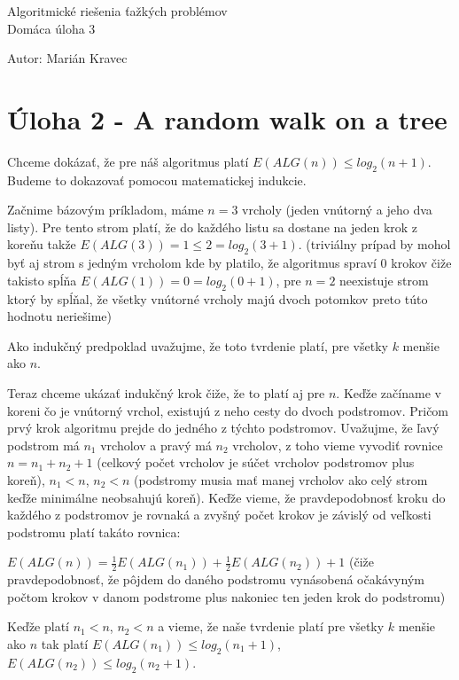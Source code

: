 \documentclass[a4paper]{article}
\begin{document}
 
	
\pagestyle{plain}

\begin{center}
	\sc\large
	Algoritmické riešenia ťažkých problémov\\
	Domáca úloha 3
\end{center}

Autor: Marián Kravec

\section{Úloha 2 - A random walk on a tree}

Chceme dokázať, že pre náš algoritmus platí $E(ALG(n)) \leq log_2(n+1)$.
\\

Budeme to dokazovať pomocou matematickej indukcie.

Začnime bázovým príkladom, máme $n=3$ vrcholy (jeden vnútorný a jeho dva listy).
Pre tento strom platí, že do každého listu sa dostane na jeden krok z koreňu takže $E(ALG(3)) = 1 \le 2 = log_2(3+1)$. (triviálny prípad by mohol byť aj strom s jedným vrcholom kde by platilo, že algoritmus spraví 0 krokov čiže takisto spĺňa $E(ALG(1)) = 0 = log_2(0+1)$, pre $n=2$ neexistuje strom ktorý by spĺňal, že všetky vnútorné vrcholy majú dvoch potomkov preto túto hodnotu neriešime)

Ako indukčný predpoklad uvažujme, že toto tvrdenie platí, pre všetky $k$ menšie ako $n$.

Teraz chceme ukázať indukčný krok čiže, že to platí aj pre $n$. Keďže začíname v koreni čo je vnútorný vrchol, existujú z neho cesty do dvoch podstromov. Pričom prvý krok algoritmu prejde do jedného z týchto podstromov. Uvažujme, že ľavý podstrom má $n_1$ vrcholov a pravý má $n_2$ vrcholov, z toho vieme vyvodiť rovnice $n=n_1+n_2+1$ (celkový počet vrcholov je súčet vrcholov podstromov plus koreň), $n_1<n$, $n_2<n$ (podstromy musia mať manej vrcholov ako celý strom keďže minimálne neobsahujú koreň). Keďže vieme, že pravdepodobnosť kroku do každého z podstromov je rovnaká a zvyšný počet krokov je závislý od veľkosti podstromu platí takáto rovnica:

$E(ALG(n)) = \frac{1}{2}E(ALG(n_1)) + \frac{1}{2}E(ALG(n_2)) + 1$ (čiže pravdepodobnosť, že pôjdem do daného podstromu vynásobená očakávyným počtom krokov v danom podstrome plus nakoniec ten jeden krok do podstromu)

Keďže platí $n_1<n$, $n_2<n$ a vieme, že naše tvrdenie platí pre všetky $k$ menšie ako $n$ tak platí $E(ALG(n_1)) \leq log_2(n_1+1)$, $E(ALG(n_2)) \leq log_2(n_2+1)$.
\end{document}
